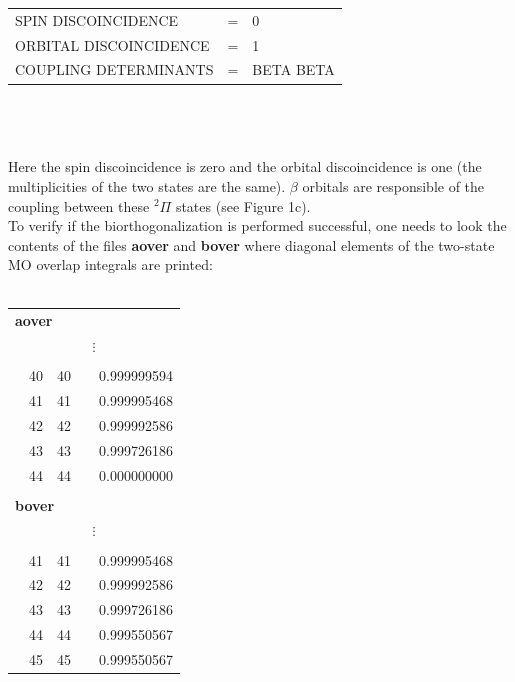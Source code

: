 \documentclass[a4paper,12pt]{article}
\begin{document}
\begin{tabular}{lll}
 SPIN DISCOINCIDENCE    &  =  & 0          \\
 ORBITAL DISCOINCIDENCE &  =  & 1          \\
 COUPLING DETERMINANTS  &  =  & BETA BETA  \\
\end{tabular} \\ \\ \\
Here the spin discoincidence is zero and the orbital discoincidence is one 
(the multiplicities of the two states are the same). $\beta$ orbitals are responsible of the 
coupling between these $^2\Pi$ states (see Figure 1c). \\
To verify if the biorthogonalization is performed successful, one needs to 
look the contents of the files {\bf aover} and {\bf bover} where diagonal elements 
of the two-state MO overlap integrals are printed: \\ \\
\begin{tabular}{lllll}
\multicolumn{5}{l}{\bf aover}                          \\
\multicolumn{5}{c}{$\vdots$}                           \\
     &           &           &      &                  \\
     &  40       &   40      &      &     0.999999594  \\
     &  41       &   41      &      &     0.999995468  \\
     &  42       &   42      &      &     0.999992586  \\
     &  43       &   43      &      &     0.999726186  \\
     &  44       &   44      &      &     0.000000000  \\
     &           &           &      &                  \\
\multicolumn{5}{l}{\bf bover}                          \\
\multicolumn{5}{c}{$\vdots$}                           \\
     &           &           &      &                  \\
     &  41       &   41      &      &     0.999995468  \\
     &  42       &   42      &      &     0.999992586  \\
     &  43       &   43      &      &     0.999726186  \\
     &  44       &   44      &      &     0.999550567  \\
     &  45       &   45      &      &     0.999550567  \\
\end{tabular} \\ \\ \\
\end{document}
